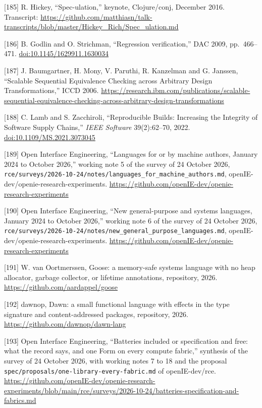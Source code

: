 \documentclass[10pt,letterpaper]{article}
\begin{document}
{[}185{]} R. Hickey, ``Spec-ulation,'' keynote, Clojure/conj, December
2016. Transcript:
\url{https://github.com/matthiasn/talk-transcripts/blob/master/Hickey_Rich/Spec_ulation.md}

{[}186{]} B. Godlin and O. Strichman, ``Regression verification,'' DAC
2009, pp.~466--471.
\href{https://doi.org/10.1145/1629911.1630034}{doi:10.1145/1629911.1630034}

{[}187{]} J. Baumgartner, H. Mony, V. Paruthi, R. Kanzelman and G.
Janssen, ``Scalable Sequential Equivalence Checking across Arbitrary
Design Transformations,'' ICCD 2006.
\url{https://research.ibm.com/publications/scalable-sequential-equivalence-checking-across-arbitrary-design-transformations}

{[}188{]} C. Lamb and S. Zacchiroli, ``Reproducible Builds: Increasing
the Integrity of Software Supply Chains,'' \emph{IEEE Software}
39(2):62--70, 2022.
\href{https://doi.org/10.1109/MS.2021.3073045}{doi:10.1109/MS.2021.3073045}

{[}189{]} Open Interface Engineering, ``Languages for or by machine
authors, January 2024 to October 2026,'' working note 5 of the survey of
24 October 2026,
\texttt{rce/\allowbreak{}surveys/\allowbreak{}2026-\allowbreak{}10-\allowbreak{}24/\allowbreak{}notes/\allowbreak{}languages\_\allowbreak{}for\_\allowbreak{}machine\_\allowbreak{}authors.\allowbreak{}md},
openIE-dev/openie-research-experiments.
\url{https://github.com/openIE-dev/openie-research-experiments}

{[}190{]} Open Interface Engineering, ``New general-purpose and systems
languages, January 2024 to October 2026,'' working note 6 of the survey
of 24 October 2026,
\texttt{rce/\allowbreak{}surveys/\allowbreak{}2026-\allowbreak{}10-\allowbreak{}24/\allowbreak{}notes/\allowbreak{}new\_\allowbreak{}general\_\allowbreak{}purpose\_\allowbreak{}languages.\allowbreak{}md},
openIE-dev/openie-research-experiments.
\url{https://github.com/openIE-dev/openie-research-experiments}

{[}191{]} W. van Oortmerssen, Goose: a memory-safe systems language with
no heap allocator, garbage collector, or lifetime annotations,
repository, 2026. \url{https://github.com/aardappel/goose}

{[}192{]} dawnop, Dawn: a small functional language with effects in the
type signature and content-addressed packages, repository, 2026.
\url{https://github.com/dawnop/dawn-lang}

{[}193{]} Open Interface Engineering, ``Batteries included or
specification and free: what the record says, and one Form on every
compute fabric,'' synthesis of the survey of 24 October 2026, with
working notes 7 to 18 and the proposal
\texttt{spec/\allowbreak{}proposals/\allowbreak{}one-\allowbreak{}library-\allowbreak{}every-\allowbreak{}fabric.\allowbreak{}md} of openIE-dev/rce.
\url{https://github.com/openIE-dev/openie-research-experiments/blob/main/rce/surveys/2026-10-24/batteries-specification-and-fabrics.md}
\end{document}
